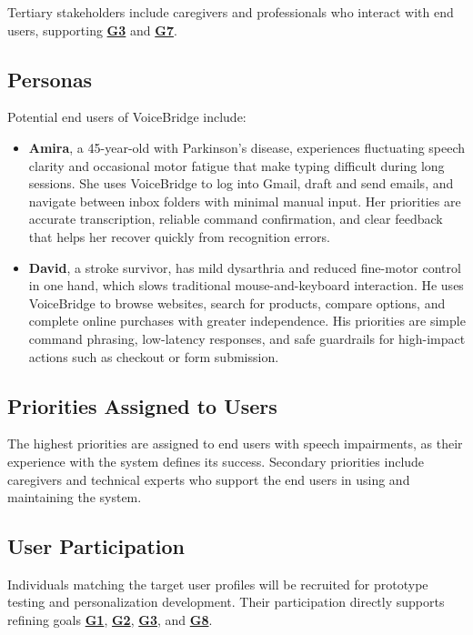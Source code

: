 \documentclass[11pt]{article}
\begin{document}
Tertiary stakeholders include caregivers and professionals who interact with end users, supporting \textbf{\hyperref[tab:project-goals]{G3}} and \textbf{\hyperref[tab:project-goals]{G7}}.

\subsection{Personas}

Potential end users of VoiceBridge include:
\begin{itemize}
  \item \textbf{Amira}, a 45-year-old with Parkinson’s disease, experiences fluctuating speech clarity and occasional motor fatigue that make typing difficult during long sessions. She uses VoiceBridge to log into Gmail, draft and send emails, and navigate between inbox folders with minimal manual input. Her priorities are accurate transcription, reliable command confirmation, and clear feedback that helps her recover quickly from recognition errors.
  \item \textbf{David}, a stroke survivor, has mild dysarthria and reduced fine-motor control in one hand, which slows traditional mouse-and-keyboard interaction. He uses VoiceBridge to browse websites, search for products, compare options, and complete online purchases with greater independence. His priorities are simple command phrasing, low-latency responses, and safe guardrails for high-impact actions such as checkout or form submission.
\end{itemize}


\subsection{Priorities Assigned to Users}

The highest priorities are assigned to end users with speech impairments, as their experience with the system defines its success. Secondary priorities include caregivers and technical experts who support the end users in using and maintaining the system.

\subsection{User Participation}

Individuals matching the target user profiles will be recruited for prototype testing and personalization development. Their participation directly supports refining goals \textbf{\hyperref[tab:project-goals]{G1}}, \textbf{\hyperref[tab:project-goals]{G2}}, \textbf{\hyperref[tab:project-goals]{G3}}, and \textbf{\hyperref[tab:project-goals]{G8}}.
\end{document}
